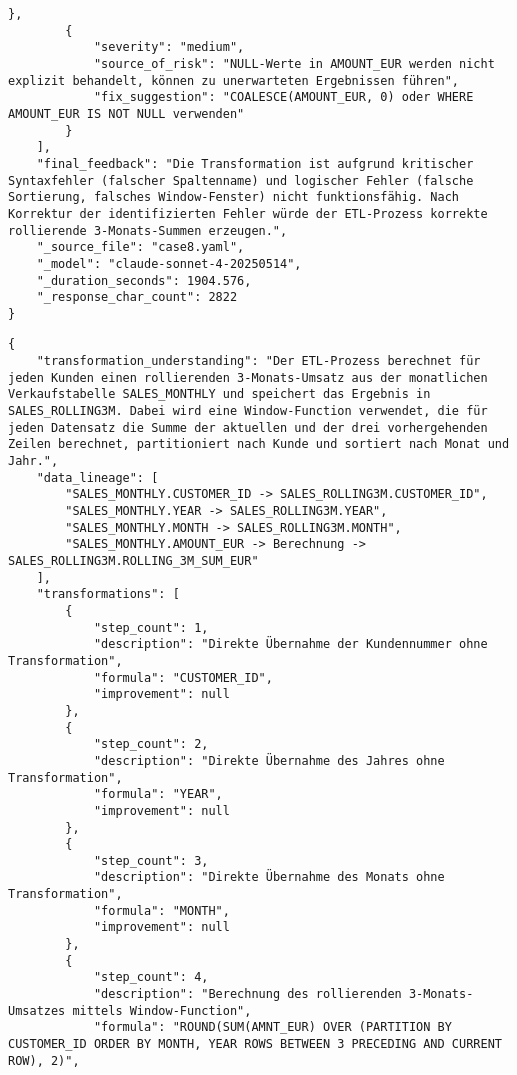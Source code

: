 \begin{lstlisting}[caption={Ausgabe: Claude Sonnet 4 Anwendungsfall 8 Konsistenzdurchlauf},label={claude_case8_prompt2}]
        },
        {
            "severity": "medium",
            "source_of_risk": "NULL-Werte in AMOUNT_EUR werden nicht explizit behandelt, können zu unerwarteten Ergebnissen führen",
            "fix_suggestion": "COALESCE(AMOUNT_EUR, 0) oder WHERE AMOUNT_EUR IS NOT NULL verwenden"
        }
    ],
    "final_feedback": "Die Transformation ist aufgrund kritischer Syntaxfehler (falscher Spaltenname) und logischer Fehler (falsche Sortierung, falsches Window-Fenster) nicht funktionsfähig. Nach Korrektur der identifizierten Fehler würde der ETL-Prozess korrekte rollierende 3-Monats-Summen erzeugen.",
    "_source_file": "case8.yaml",
    "_model": "claude-sonnet-4-20250514",
    "_duration_seconds": 1904.576,
    "_response_char_count": 2822
}
\end{lstlisting}

\begin{lstlisting}[caption={Ausgabe: Claude Sonnet 4 Anwendungsfall 8 Robustheitsdurchlauf},label={claude_case8_prompt3}]
{
    "transformation_understanding": "Der ETL-Prozess berechnet für jeden Kunden einen rollierenden 3-Monats-Umsatz aus der monatlichen Verkaufstabelle SALES_MONTHLY und speichert das Ergebnis in SALES_ROLLING3M. Dabei wird eine Window-Function verwendet, die für jeden Datensatz die Summe der aktuellen und der drei vorhergehenden Zeilen berechnet, partitioniert nach Kunde und sortiert nach Monat und Jahr.",
    "data_lineage": [
        "SALES_MONTHLY.CUSTOMER_ID -> SALES_ROLLING3M.CUSTOMER_ID",
        "SALES_MONTHLY.YEAR -> SALES_ROLLING3M.YEAR",
        "SALES_MONTHLY.MONTH -> SALES_ROLLING3M.MONTH",
        "SALES_MONTHLY.AMOUNT_EUR -> Berechnung -> SALES_ROLLING3M.ROLLING_3M_SUM_EUR"
    ],
    "transformations": [
        {
            "step_count": 1,
            "description": "Direkte Übernahme der Kundennummer ohne Transformation",
            "formula": "CUSTOMER_ID",
            "improvement": null
        },
        {
            "step_count": 2,
            "description": "Direkte Übernahme des Jahres ohne Transformation",
            "formula": "YEAR",
            "improvement": null
        },
        {
            "step_count": 3,
            "description": "Direkte Übernahme des Monats ohne Transformation",
            "formula": "MONTH",
            "improvement": null
        },
        {
            "step_count": 4,
            "description": "Berechnung des rollierenden 3-Monats-Umsatzes mittels Window-Function",
            "formula": "ROUND(SUM(AMNT_EUR) OVER (PARTITION BY CUSTOMER_ID ORDER BY MONTH, YEAR ROWS BETWEEN 3 PRECEDING AND CURRENT ROW), 2)",

\end{lstlisting}
